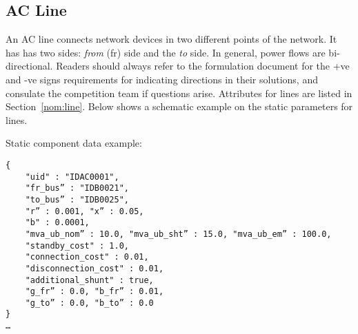 \subsection{AC Line}
\label{sec:acline}
An AC line connects network devices in two different points of the network. 
It has has two sides: \emph{from} (fr) side and the \emph{to} side.
In general, power flows are bi-directional. 
Readers should always refer to the formulation document for the +ve and -ve signs
requirements for indicating directions in their solutions,
and consulate the competition team if questions arise.
Attributes for lines are listed in Section~\ref{nom:line}.
Below shows a schematic example on the static parameters for lines.

Static component data example:
\begin{verbatim}
{
    "uid" : "IDAC0001",
    "fr_bus” : "IDB0021",
    "to_bus” : "IDB0025",
    "r” : 0.001, "x” : 0.05, 
    "b" : 0.0001,
    "mva_ub_nom” : 10.0, "mva_ub_sht” : 15.0, "mva_ub_em” : 100.0,
    "standby_cost" : 1.0,
    "connection_cost" : 0.01,
    "disconnection_cost" : 0.01,
    "additional_shunt" : true,
    "g_fr” : 0.0, "b_fr” : 0.01,
    "g_to” : 0.0, "b_to” : 0.0    
}
…     
\end{verbatim}


